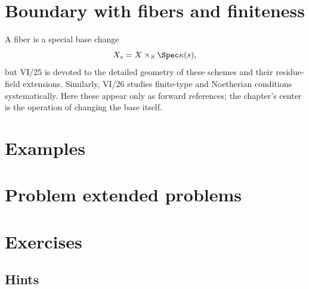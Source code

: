 \section{Boundary with fibers and finiteness}
A fiber is a special base change
\[
X_s=X\times_S\Spec\kappa(s),
\]
but VI/25 is devoted to the detailed geometry of these schemes and their residue-field extensions.
Similarly, VI/26 studies finite-type and Noetherian conditions systematically.  Here these appear only
as forward references; the chapter's center is the operation of changing the base itself.

\section{Examples}



\section{Problem extended problems}





















\section{Exercises}

\ifdefined\IncludeExerciseHints
\subsection*{Hints}

\fi
\ifdefined\IncludeExerciseSolutions

